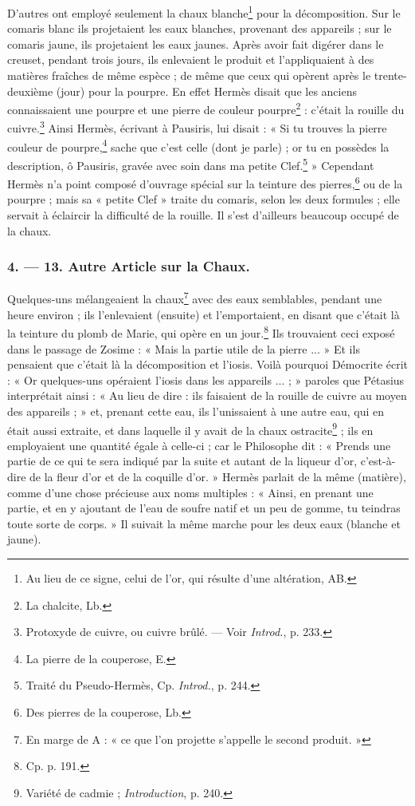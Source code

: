 \documentclass[a4paper, 11pt, oneside, polutonikogreek, french]{article}
\begin{document}
D'autres ont employé seulement la chaux blanche\footnote{Au lieu de ce signe, celui de l'or, qui résulte d'une altération, AB.} pour la décomposition. Sur le comaris blanc ils projetaient les eaux blanches, provenant des appareils ; sur le comaris jaune, ils projetaient les eaux jaunes. Après avoir fait digérer dans le creuset, pendant trois jours, ils enlevaient le produit et l'appliquaient à des matières fraîches de même espèce ; de même que ceux qui opèrent après le trente-deuxième (jour) pour la pourpre. En effet Hermès disait que les anciens connaissaient une pourpre et une pierre de couleur pourpre\footnote{La chalcite, Lb.} : c'était la rouille du cuivre.\footnote{Protoxyde de cuivre, ou cuivre brûlé. --- Voir \emph{Introd.}, p. 233.} Ainsi Hermès, écrivant à Pausiris, lui disait : « Si tu trouves la pierre couleur de pourpre,\footnote{La pierre de la couperose, E.} sache que c'est celle (dont je parle) ; or tu en possèdes la description, ô Pausiris, gravée avec soin dans ma petite Clef.\footnote{Traité du Pseudo-Hermès, Cp. \emph{Introd.}, p. 244.} » Cependant Hermès n'a point composé d'ouvrage spécial sur la teinture des pierres,\footnote{Des pierres de la couperose, Lb.} ou de la pourpre ; mais sa « petite Clef » traite du comaris, selon les deux formules ; elle servait à éclaircir la difficulté de la rouille. Il s'est d'ailleurs beaucoup occupé de la chaux.
\clearpage
\bigskip
\centerline{\EightStarTaper}
\centerline{\EightStarTaper\EightStarTaper}
\bigskip

\subsubsection{4. --- 13. Autre Article sur la Chaux.}

Quelques-uns mélangeaient la chaux\footnote{En marge de A : « ce que l'on projette s'appelle le second produit. »} avec des eaux semblables, pendant une heure environ ; ils l'enlevaient (ensuite) et l'emportaient, en disant que c'était là la teinture du plomb de Marie, qui opère en un jour.\footnote{Cp. p. 191.} Ils trouvaient ceci exposé dans le passage de Zosime : « Mais la partie utile de la pierre ... » Et ils pensaient que c'était là la décomposition et l'iosis. Voilà pourquoi Démocrite écrit : « Or quelques-uns opéraient l'iosis dans les appareils ... ; » paroles que Pétasius interprétait ainsi : « Au lieu de dire : ils faisaient de la rouille de cuivre au moyen des appareils ; » et, prenant cette eau, ils l'unissaient à une autre eau, qui en était aussi extraite, et dans laquelle il y avait de la chaux ostracite\footnote{Variété de cadmie ; \emph{Introduction}, p. 240.} ; ils en employaient une quantité égale à celle-ci ; car le Philosophe dit : « Prends une partie de ce qui te sera indiqué par la suite et autant de la liqueur d'or, c'est-à-dire de la fleur d'or et de la coquille d'or. » Hermès parlait de la même (matière), comme d'une chose précieuse aux noms multiples : « Ainsi, en prenant une partie, et en y ajoutant de l'eau de soufre natif et un peu de gomme, tu teindras toute sorte de corps. » Il suivait la même marche pour les deux eaux (blanche et jaune).
\end{document}
